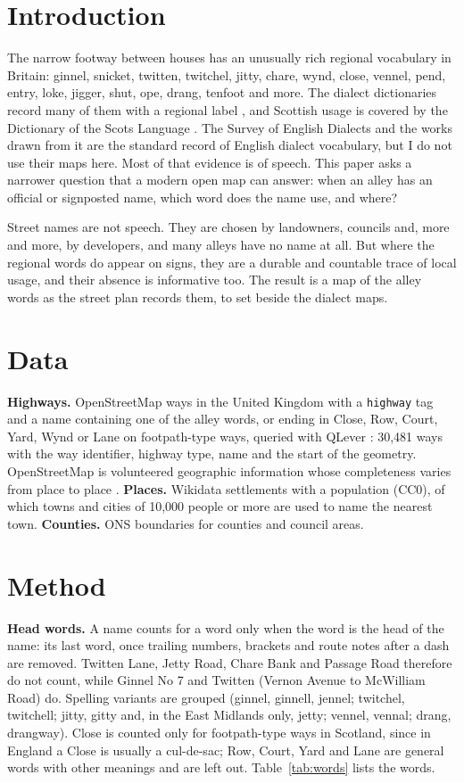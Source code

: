 \documentclass[11pt,a4paper]{article}
\begin{document}
\section{Introduction}
The narrow footway between houses has an unusually rich regional vocabulary in Britain: ginnel, snicket, twitten, twitchel, jitty, chare, wynd, close, vennel, pend, entry, loke, jigger, shut, ope, drang, tenfoot and more. The dialect dictionaries record many of them with a regional label \citep{wright1898}, and Scottish usage is covered by the Dictionary of the Scots Language \citep{dsl}. The Survey of English Dialects and the works drawn from it \citep{orton1962,upton1987,upton1994,upton1996} are the standard record of English dialect vocabulary, but I do not use their maps here. Most of that evidence is of speech. This paper asks a narrower question that a modern open map can answer: when an alley has an official or signposted name, which word does the name use, and where?

Street names are not speech. They are chosen by landowners, councils and, more and more, by developers, and many alleys have no name at all. But where the regional words do appear on signs, they are a durable and countable trace of local usage, and their absence is informative too. The result is a map of the alley words as the street plan records them, to set beside the dialect maps.

\section{Data}
\textbf{Highways.} OpenStreetMap ways in the United Kingdom with a \texttt{highway} tag and a name containing one of the alley words, or ending in Close, Row, Court, Yard, Wynd or Lane on footpath-type ways, queried with QLever \citep{bast2017}: 30,481 ways with the way identifier, highway type, name and the start of the geometry. OpenStreetMap is volunteered geographic information whose completeness varies from place to place \citep{haklay2010}. \textbf{Places.} Wikidata settlements with a population (CC0), of which towns and cities of 10,000 people or more are used to name the nearest town. \textbf{Counties.} ONS boundaries for counties and council areas.

\section{Method}
\textbf{Head words.} A name counts for a word only when the word is the head of the name: its last word, once trailing numbers, brackets and route notes after a dash are removed. Twitten Lane, Jetty Road, Chare Bank and Passage Road therefore do not count, while Ginnel No 7 and Twitten (Vernon Avenue to McWilliam Road) do. Spelling variants are grouped (ginnel, ginnell, jennel; twitchel, twitchell; jitty, gitty and, in the East Midlands only, jetty; vennel, vennal; drang, drangway). Close is counted only for footpath-type ways in Scotland, since in England a Close is usually a cul-de-sac; Row, Court, Yard and Lane are general words with other meanings and are left out. Table~\ref{tab:words} lists the words.
\end{document}

